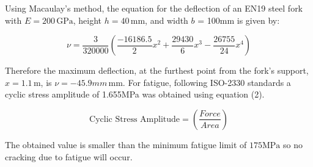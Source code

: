 \documentclass[12pt,titlepage]{article}
\begin{document}
\vspace{-10pt}
Using Macaulay's method, the equation for the deflection of an EN19 steel fork with \( E = 200 \, \text{GPa} \), height \( h = 40 \, \text{mm} \), and width $b$ = 100mm \cite{ForkDimensions} is given by:

\vspace{-17pt}
\begin{equation}
   \nu = \frac{3}{320000} \left( \frac{-16186.5}{2}x^2 + \frac{29430}{6}x^3 - \frac{26755}{24}x^4 \right)
\end{equation}
\vspace{-27pt}

Therefore the maximum deflection, at the furthest point from the fork's support, \(x = 1.1 \, \text{m}\), is \(\nu = -45.9mm \, \text{mm}\).
For fatigue, following ISO-2330 standards a cyclic stress amplitude of 1.655MPa was obtained using equation (2).

\vspace{-20pt}
\begin{equation}
   \text{Cyclic Stress Amplitude} = \left (\frac{Force}{Area} \right)
\end{equation}
\vspace{-30pt}

The obtained value is smaller than the minimum fatigue limit of \(175 \text{MPa}\) so no cracking due to fatigue will occur.
\end{document}
